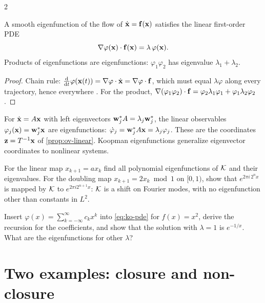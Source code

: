 \begin{paracol}{2}
\begin{proposition}\label{prop:ko-pde}
A smooth eigenfunction of the flow of $\dot{\mathbf{x}}=\mathbf{f}(\mathbf{x})$ satisfies the linear first-order PDE
\begin{equation}\label{eq:ko-pde}
  \nabla\varphi(\mathbf{x})\cdot\mathbf{f}(\mathbf{x})=\lambda\,\varphi(\mathbf{x}).
\end{equation}
Products of eigenfunctions are eigenfunctions: $\varphi_1\varphi_2$ has eigenvalue $\lambda_1+\lambda_2$.
\end{proposition}
\begin{proof}
Chain rule: $\frac{\mathrm d}{\mathrm dt}\varphi(\mathbf{x}(t))=\nabla\varphi\cdot\dot{\mathbf{x}}=\nabla\varphi\cdot\mathbf{f}$,
which must equal $\lambda\varphi$ along every trajectory, hence everywhere .
For the product, $\nabla(\varphi_1\varphi_2)\cdot\mathbf{f}=\varphi_2\lambda_1\varphi_1+\varphi_1\lambda_2\varphi_2$.
\end{proof}

\begin{example}
For $\dot{\mathbf{x}}=A\mathbf{x}$ with left eigenvectors $\mathbf{w}_j^*A=\lambda_j\mathbf{w}_j^*$, the linear observables
$\varphi_j(\mathbf{x})=\mathbf{w}_j^*\mathbf{x}$ are eigenfunctions: $\dot\varphi_j=\mathbf{w}_j^*A\mathbf{x}=\lambda_j\varphi_j$.
These are the coordinates $\mathbf{z}=T^{-1}\mathbf{x}$ of \cref{prop:ov-linear}. Koopman eigenfunctions
generalize eigenvector coordinates to nonlinear systems.
\end{example}

\begin{exercise}
For the linear map $x_{k+1}=ax_k$ find all polynomial eigenfunctions of $\mathcal{K}$ and their eigenvalues. For the
doubling map $x_{k+1}=2x_k\bmod1$ on $[0,1)$, show that $e^{2\pi i\,2^nx}$ is mapped by $\mathcal{K}$ to $e^{2\pi i2^{n+1}x}$:
$\mathcal{K}$ is a shift on Fourier modes, with no eigenfunction other than constants in $L^2$.
\end{exercise}

\begin{exercise}
Insert $\varphi(x)=\sum_{k=-\infty}^{\infty}c_kx^k$ into \eqref{eq:ko-pde} for $f(x)=x^2$, derive the recursion for
the coefficients, and show that the solution with $\lambda=1$ is $e^{-1/x}$. What are the eigenfunctions for
other $\lambda$?
\end{exercise}

\section{Two examples: closure and non-closure}\label{sec:ko-examples}


\end{paracol}
